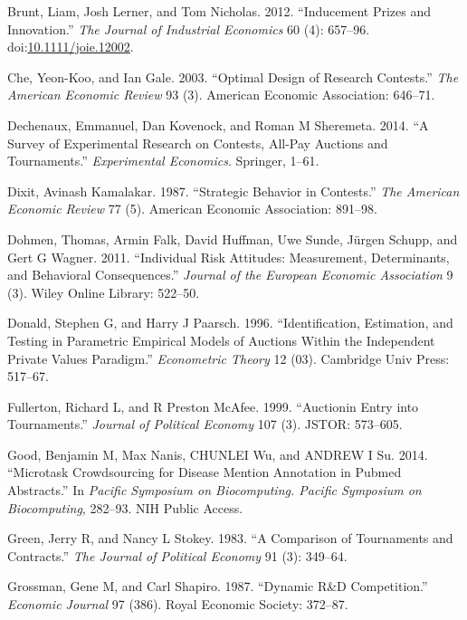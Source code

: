 \documentclass[11pt, titlepage]{article}
\begin{document}
\hypertarget{ref-Brunt:2012ix}{}
Brunt, Liam, Josh Lerner, and Tom Nicholas. 2012. ``Inducement Prizes
and Innovation.'' \emph{The Journal of Industrial Economics} 60 (4):
657--96.
doi:\href{https://doi.org/10.1111/joie.12002}{10.1111/joie.12002}.

\hypertarget{ref-che2003optimal}{}
Che, Yeon-Koo, and Ian Gale. 2003. ``Optimal Design of Research
Contests.'' \emph{The American Economic Review} 93 (3). American
Economic Association: 646--71.

\hypertarget{ref-dechenaux2014survey}{}
Dechenaux, Emmanuel, Dan Kovenock, and Roman M Sheremeta. 2014. ``A
Survey of Experimental Research on Contests, All-Pay Auctions and
Tournaments.'' \emph{Experimental Economics}. Springer, 1--61.

\hypertarget{ref-dixit1987strategic}{}
Dixit, Avinash Kamalakar. 1987. ``Strategic Behavior in Contests.''
\emph{The American Economic Review} 77 (5). American Economic
Association: 891--98.

\hypertarget{ref-dohmen2011individual}{}
Dohmen, Thomas, Armin Falk, David Huffman, Uwe Sunde, Jürgen Schupp, and
Gert G Wagner. 2011. ``Individual Risk Attitudes: Measurement,
Determinants, and Behavioral Consequences.'' \emph{Journal of the
European Economic Association} 9 (3). Wiley Online Library: 522--50.

\hypertarget{ref-donald1996identification}{}
Donald, Stephen G, and Harry J Paarsch. 1996. ``Identification,
Estimation, and Testing in Parametric Empirical Models of Auctions
Within the Independent Private Values Paradigm.'' \emph{Econometric
Theory} 12 (03). Cambridge Univ Press: 517--67.

\hypertarget{ref-fullerton1999auctionin}{}
Fullerton, Richard L, and R Preston McAfee. 1999. ``Auctionin Entry into
Tournaments.'' \emph{Journal of Political Economy} 107 (3). JSTOR:
573--605.

\hypertarget{ref-good2014microtask}{}
Good, Benjamin M, Max Nanis, CHUNLEI Wu, and ANDREW I Su. 2014.
``Microtask Crowdsourcing for Disease Mention Annotation in Pubmed
Abstracts.'' In \emph{Pacific Symposium on Biocomputing. Pacific
Symposium on Biocomputing}, 282--93. NIH Public Access.

\hypertarget{ref-green1983comparison}{}
Green, Jerry R, and Nancy L Stokey. 1983. ``A Comparison of Tournaments
and Contracts.'' \emph{The Journal of Political Economy} 91 (3):
349--64.

\hypertarget{ref-grossman1987dynamic}{}
Grossman, Gene M, and Carl Shapiro. 1987. ``Dynamic R\&D Competition.''
\emph{Economic Journal} 97 (386). Royal Economic Society: 372--87.
\end{document}
